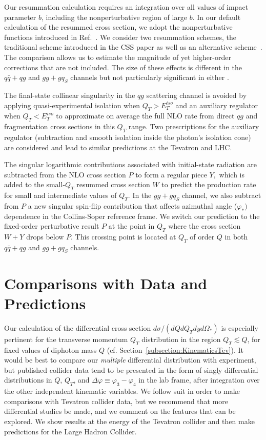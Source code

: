 \documentclass[12pt,english,aps,preprint,prd,letterpaper,fleqn,nofootinbib,showpacs,showkeys,tightenlines,floatfix]{revtex4}
\begin{document}
Our resummation calculation requires an integration over all values
of impact parameter $b$, including the nonperturbative region of
large $b$. In our default calculation of the resummed cross section,
we adopt the nonperturbative functions introduced in Ref.~\cite{Konychev:2005iy}.
We consider two resummation schemes, the traditional scheme introduced
in the CSS paper as well as an alternative scheme~\cite{Catani:2000vq}.
The comparison allows us to estimate the magnitude of yet higher-order
corrections that are not included. The size of these effects is different
in the $q\bar{q}+qg$ and $gg+gq_{S}$ channels but not particularly
significant in either \cite{Nadolsky:2007ba}.

The final-state collinear singularity in the $qg$ scattering channel
is avoided by applying quasi-experimental isolation when $Q_{T}>E_{T}^{iso}$
and an auxiliary regulator when $Q_{T}<E_{T}^{iso}$ to approximate
on average the full NLO rate from direct $qg$ and fragmentation cross
sections in this $Q_{T}$ range. Two prescriptions for the auxiliary
regulator (subtraction and smooth isolation inside the photon's
isolation cone) are considered and lead to similar predictions at
the Tevatron and LHC.

The singular logarithmic contributions associated with initial-state
radiation are subtracted from the NLO cross section $P$ to form a
regular piece $Y,$ which is added to the small-$Q_{T}$ resummed
cross section $W$ to predict the production rate for small and intermediate
values of $Q_{T}$. In the $gg+gq_{S}$ channel, we also subtract
from $P$ a new singular spin-flip contribution that affects azimuthal
angle ($\varphi_{*})$ dependence in the Collins-Soper reference frame.
We switch our prediction to the fixed-order perturbative result $P$
at the point in $Q_{T}$ where the cross section $W+Y$ drops below
$P$. This crossing point is located at $Q_{T}$ of order $Q$ in both 
$q\bar{q}+qg$ and $gg+gq_{S}$ channels.


\section{Comparisons with Data and Predictions \label{Sec:Phenomenology}}

Our calculation of the differential cross section $d\sigma/(dQdQ_{T}dyd\Omega_{*})$
is especially pertinent for the transverse momentum $Q_{T}$ distribution
in the region $Q_{T}\lesssim Q$, for fixed values of diphoton mass
$Q$ (cf. Section~\ref{subsection:KinematicsTev}). It would be best
to compare our \emph{multiple} differential distribution with experiment,
but published collider data tend to be presented in the form of singly
differential distributions in $Q$, $Q_{T}$, and $\Delta\varphi\equiv\varphi_{3}-\varphi_{4}$
in the lab frame, after integration over the other independent kinematic
variables. We follow suit in order to make comparisons with Tevatron
collider data, but we recommend that more differential studies be
made, and we comment on the features that can be explored. We show
results at the energy of the Tevatron collider and then make predictions
for the Large Hadron Collider.
\end{document}
